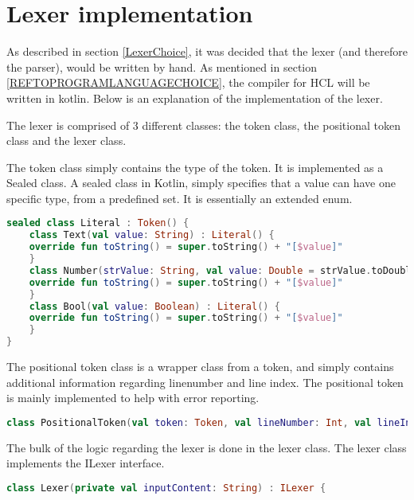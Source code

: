 \section{Lexer implementation}
As described in section \ref{LexerChoice}, it was decided that the lexer (and therefore the parser), would be written by hand.
As mentioned in section \ref{REFTOPROGRAMLANGUAGECHOICE}, the compiler for HCL will be written in kotlin.
Below is an explanation of the implementation of the lexer.

The lexer is comprised of 3 different classes: the token class, the positional token class and the lexer class.

The token class simply contains the type of the token. 
It is implemented as a Sealed class. 
A sealed class in Kotlin, simply specifies that a value can have one specific type, from a predefined set\cite{KotlinSealed}.
It is essentially an extended enum.
\begin{lstlisting}[language=Kotlin,label=lis:tokenClass,caption=A snippet from the token class .,firstnumber=9]
sealed class Literal : Token() {
	class Text(val value: String) : Literal() {
	override fun toString() = super.toString() + "[$value]"
	}
	class Number(strValue: String, val value: Double = strValue.toDouble()) : Literal() {
	override fun toString() = super.toString() + "[$value]"
	}
	class Bool(val value: Boolean) : Literal() {
	override fun toString() = super.toString() + "[$value]"
	}
}
\end{lstlisting}

The positional token class is a wrapper class from a token, and simply contains additional information regarding linenumber and line index.
The positional token is mainly implemented to help with error reporting.
\begin{lstlisting}[language=Kotlin,label=lis:PositionalTokenClass,caption=A snippet from the token class .,firstnumber=10]
class PositionalToken(val token: Token, val lineNumber: Int, val lineIndex: Int)
\end{lstlisting}

The bulk of the logic regarding the lexer is done in the lexer class.
The lexer class implements the ILexer interface.

\begin{lstlisting}[language=Kotlin,label=lis:Lexer,caption=The Lexer .,firstnumber=8]
class Lexer(private val inputContent: String) : ILexer {
\end{lstlisting}

